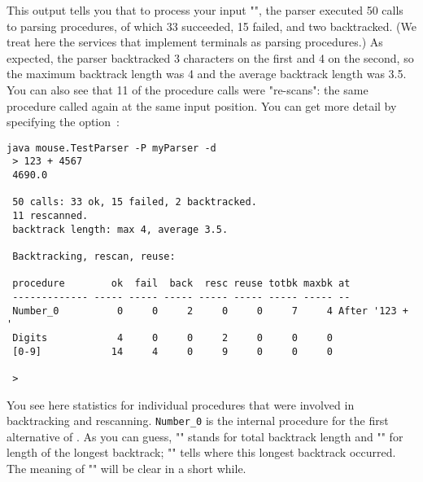 This output tells you that to process your input "",
the parser executed 50 calls to parsing procedures,
of which 33 succeeded, 15 failed, and two backtracked.
(We treat here the services that implement terminals as parsing procedures.)
As expected, the parser backtracked 3 characters on the first 
and 4 on the second, so the maximum backtrack length was 4 
and the average backtrack length was 3.5.
You can also see that 11 of the procedure calls were "re-scans":
the same procedure called again at the same input position.
You can get more detail by specifying the option~:

\small
\begin{Verbatim}[samepage=true,xleftmargin=15mm,baselinestretch=0.8]
 java mouse.TestParser -P myParser -d
 > 123 + 4567   
 4690.0

 50 calls: 33 ok, 15 failed, 2 backtracked.
 11 rescanned.
 backtrack length: max 4, average 3.5.

 Backtracking, rescan, reuse:

 procedure        ok  fail  back  resc reuse totbk maxbk at
 ------------- ----- ----- ----- ----- ----- ----- ----- --
 Number_0          0     0     2     0     0     7     4 After '123 + '
 Digits            4     0     0     2     0     0     0
 [0-9]            14     4     0     9     0     0     0

 >
\end{Verbatim}
\normalsize

You see here statistics for individual procedures that were involved
in backtracking and rescanning.
\verb#Number_0# is the internal procedure for the first alternative of \Number.
As you can guess, "" stands for total backtrack length
and "" for length of the longest backtrack; 
"" tells where this longest backtrack occurred.
The meaning of "" will be clear in a short while.
